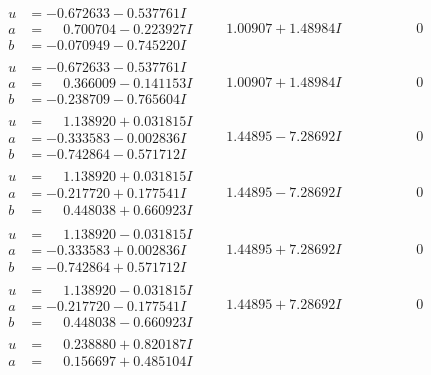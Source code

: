 \documentclass[1p]{elsarticle_modified}
\theoremstyle{definition}
\begin{document}
$$\begin{array}{c|c|c}
 \hline 
\begin{aligned}
u &= -0.672633 - 0.537761 I \\
a &= \phantom{-}0.700704 - 0.223927 I \\
b &= -0.070949 - 0.745220 I\end{aligned}
 & \phantom{-}1.00907 + 1.48984 I & \phantom{-0.000000 } 0 \\ \hline\begin{aligned}
u &= -0.672633 - 0.537761 I \\
a &= \phantom{-}0.366009 - 0.141153 I \\
b &= -0.238709 - 0.765604 I\end{aligned}
 & \phantom{-}1.00907 + 1.48984 I & \phantom{-0.000000 } 0 \\ \hline\begin{aligned}
u &= \phantom{-}1.138920 + 0.031815 I \\
a &= -0.333583 - 0.002836 I \\
b &= -0.742864 - 0.571712 I\end{aligned}
 & \phantom{-}1.44895 - 7.28692 I & \phantom{-0.000000 } 0 \\ \hline\begin{aligned}
u &= \phantom{-}1.138920 + 0.031815 I \\
a &= -0.217720 + 0.177541 I \\
b &= \phantom{-}0.448038 + 0.660923 I\end{aligned}
 & \phantom{-}1.44895 - 7.28692 I & \phantom{-0.000000 } 0 \\ \hline\begin{aligned}
u &= \phantom{-}1.138920 - 0.031815 I \\
a &= -0.333583 + 0.002836 I \\
b &= -0.742864 + 0.571712 I\end{aligned}
 & \phantom{-}1.44895 + 7.28692 I & \phantom{-0.000000 } 0 \\ \hline\begin{aligned}
u &= \phantom{-}1.138920 - 0.031815 I \\
a &= -0.217720 - 0.177541 I \\
b &= \phantom{-}0.448038 - 0.660923 I\end{aligned}
 & \phantom{-}1.44895 + 7.28692 I & \phantom{-0.000000 } 0 \\ \hline\begin{aligned}
u &= \phantom{-}0.238880 + 0.820187 I \\
a &= \phantom{-}0.156697 + 0.485104 I \\

\end{aligned}
\end{array}$$
\end{document}
